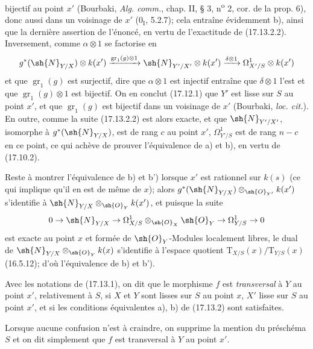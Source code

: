 
bijectif au point $x'$ (Bourbaki, \emph{Alg. comm.}, chap. II, § 3, n\textsuperscript{o} 2, cor. de la prop. 6), donc aussi dans un voisinage de $x'$ (0$_{\mathrm I}$, 5.2.7); cela entraîne évidemment b), ainsi que la dernière assertion de l'énoncé, en vertu de l'exactitude de (17.13.2.2). Inversement, comme $\alpha\otimes1$ se factorise en
\[
g^*(\sh{N}_{Y/X})\otimes k(x')\xrightarrow{\operatorname{gr}_1(g)\otimes1}\sh{N}_{Y'/X'}\otimes k(x')\xrightarrow{\delta\otimes1}\Omega^1_{X'/S}\otimes k(x')
\]
et que $\operatorname{gr}_1(g)$ est surjectif, dire que $\alpha\otimes1$ est injectif entraîne que $\delta\otimes1$ l'est et que $\operatorname{gr}_1(g)\otimes1$ est bijectif. On en conclut (17.12.1) que $Y'$ est lisse sur $S$ au point $x'$, et que $\operatorname{gr}_1(g)$ est bijectif dans un voisinage de $x'$ (Bourbaki, \emph{loc. cit.}). En outre, comme la suite (17.13.2.2) est alors exacte, et que $\sh{N}_{Y'/X'}$, isomorphe à $g^*(\sh{N}_{Y/X})$, est de rang $c$ au point $x'$, $\Omega^1_{Y'/S}$ est de rang $n-c$ en ce point, ce qui achève de prouver l'équivalence de a) et b), en vertu de (17.10.2).

Reste à montrer l'équivalence de b) et b') lorsque $x'$ est rationnel sur $k(s)$ (ce qui implique qu'il en est de même de $x$); alors $g^*(\sh{N}_{Y/X})\otimes_{\sh{O}_{Y'}}k(x')$ s'identifie à $\sh{N}_{Y/X}\otimes_{\sh{O}_Y}k(x')$, et puisque la suite
\[
0\to\sh{N}_{Y/X}\to\Omega^1_{X/S}\otimes_{\sh{O}_X}\sh{O}_Y\to\Omega^1_{Y/S}\to0
\]
est exacte au point $x$ et formée de $\sh{O}_Y$-Modules localement libres, le dual de $\sh{N}_{Y/X}\otimes_{\sh{O}_Y}k(x)$ s'identifie à l'espace quotient $\mathrm{T}_{X/S}(x)/\mathrm{T}_{Y/S}(x)$ (16.5.12); d'où l'équivalence de b) et b').

\begin{definition}[17.13.3]
Avec les notations de (17.13.1), on dit que le morphisme $f$ est \emph{transversal} à $Y$ au point $x'$, relativement à $S$, si $X$ et $Y$ sont lisses sur $S$ au point $x$, $X'$ lisse sur $S$ au point $x'$, et si les conditions équivalentes a), b) de (17.13.2) sont satisfaites.
\end{definition}

Lorsque aucune confusion n'est à craindre, on supprime la mention du préschéma $S$ et on dit simplement que $f$ est transversal à $Y$ au point $x'$.

